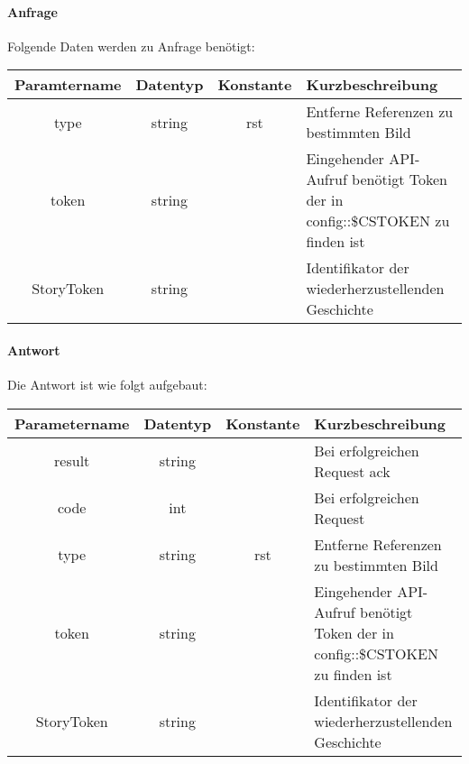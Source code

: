 \paragraph{Anfrage}Folgende Daten werden zu Anfrage benötigt:
\begin{table}[H]
	\begin{tabular}{|c|c|c|p{6.5cm}|}
		\hline
		\textbf{Paramtername} & \textbf{Datentyp} & \textbf{Konstante} & \textbf{Kurzbeschreibung}                                                                                               \\ \hline
		type                & string            & rst                & Entferne Referenzen zu bestimmten Bild \\ \hline
		token               & string            &                    & Eingehender API-Aufruf benötigt Token der in config::\$CSTOKEN zu finden ist \\ \hline
		StoryToken          & string            &                    & Identifikator der wiederherzustellenden Geschichte \\ \hline
	\end{tabular} 
\end{table}
\paragraph{Antwort}Die Antwort ist wie folgt aufgebaut:
\begin{table}[H]
	\begin{tabular}{|c|c|c|p{6.5cm}|}
		\hline
		\textbf{Parametername} & \textbf{Datentyp} & \textbf{Konstante} & \textbf{Kurzbeschreibung}                                                                                               \\ \hline
		result              & string            &                    & Bei erfolgreichen Request {\glqq ack\grqq}                                                                            \\ \hline
		code                & int               &                    & Bei erfolgreichen Request {\glqq 0\grqq} \\ \hline
		type                & string            & rst                & Entferne Referenzen zu bestimmten Bild \\ \hline
		token               & string            &                    & Eingehender API-Aufruf benötigt Token der in config::\$CSTOKEN zu finden ist \\ \hline
		StoryToken          & string            &                    & Identifikator der wiederherzustellenden Geschichte \\ \hline       
	\end{tabular}
\end{table}

